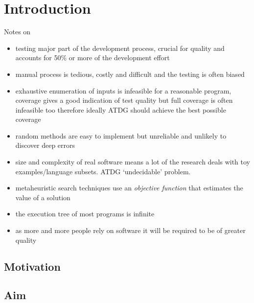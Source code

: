 \documentclass[a4paper,11pt,titlepage]{report}
\begin{document}
\chapter{Introduction}
Notes on \cite{mcminn2004search}
\begin{itemize}
\item testing major part of the development process, crucial for quality and accounts for 50\% or more of the development effort
\item manual process is tedious, costly and difficult and the testing is often biased
\item exhaustive enumeration of inputs is infeasible for a reasonable program, coverage gives a good indication of test quality but full coverage is often infeasible too therefore ideally ATDG should achieve the best possible coverage
\item random methods are easy to implement but unreliable and unlikely to discover deep errors
\item size and complexity of real software means a lot of the research deals with toy examples/language subsets. ATDG `undecidable' problem.
\item metaheuristic search techniques use an \emph{objective function} that estimates the value of a solution
\item the execution tree of most programs is infinite \cite{king1976symbolic}
\item as more and more people rely on software it will be required to be of greater quality

\end{itemize}

\section{Motivation}
\section{Aim}
\end{document}
